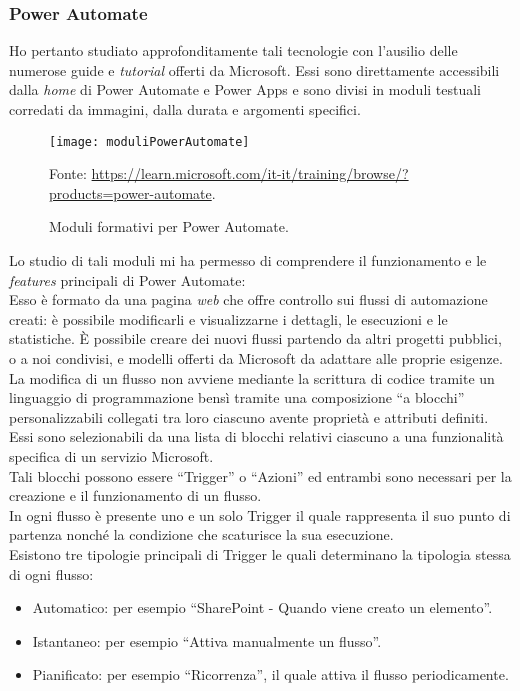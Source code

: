 \subsubsection*{Power Automate}
Ho pertanto studiato approfonditamente tali tecnologie con l'ausilio delle numerose guide e \emph{tutorial} offerti da Microsoft. 
Essi sono direttamente accessibili dalla \emph{home} di Power Automate e Power Apps e sono divisi in moduli testuali corredati da immagini, dalla durata e argomenti specifici. 

\begin{figure}[htbp] 
    \centering 
    \texttt{[image: moduliPowerAutomate]} 
    \caption{Moduli formativi per Power Automate.}
    \label{fig:moduliPowerAutomate}
    \vspace{1mm}
    Fonte: \url{https://learn.microsoft.com/it-it/training/browse/?products=power-automate}.
\end{figure}

\noindent Lo studio di tali moduli mi ha permesso di comprendere il funzionamento e le \emph{features} principali di Power Automate:\\
Esso è formato da una pagina \emph{web} che offre controllo sui flussi di automazione creati: è possibile modificarli e visualizzarne i dettagli, le esecuzioni e le statistiche. È possibile creare dei nuovi flussi partendo da altri progetti pubblici, o a noi condivisi, e modelli offerti da Microsoft da adattare alle proprie esigenze.\\
La modifica di un flusso non avviene mediante la scrittura di codice tramite un linguaggio di programmazione bensì tramite una composizione “a blocchi” personalizzabili collegati tra loro ciascuno avente proprietà e attributi definiti.\\
Essi sono selezionabili da una lista di blocchi relativi ciascuno a una funzionalità specifica di un servizio Microsoft.\\
Tali blocchi possono essere “Trigger” o “Azioni” ed entrambi sono necessari per la creazione e il funzionamento di un flusso.\\ 
In ogni flusso è presente uno e un solo Trigger il quale rappresenta il suo punto di partenza nonché la condizione che scaturisce la sua esecuzione.\\
Esistono tre tipologie principali di Trigger le quali determinano la tipologia stessa di ogni flusso:
\begin{itemize}
    \item Automatico: per esempio “SharePoint - Quando viene creato un elemento”. 
    \item Istantaneo: per esempio “Attiva manualmente un flusso”.
    \item Pianificato: per esempio “Ricorrenza”, il quale attiva il flusso periodicamente.\\
\end{itemize}

